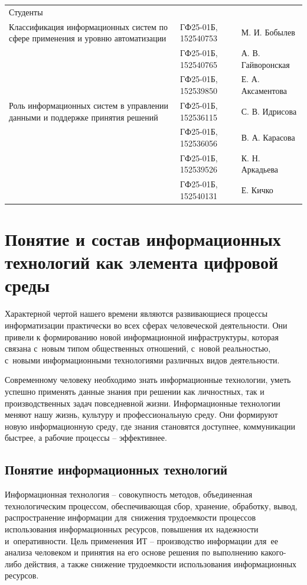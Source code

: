 \documentclass{ou}
\begin{document}
\begin{flushleft}
\doublespacing
\begin{tabularx}{\textwidth}{@{} p{} l l @{}}
Студенты     &                     &         \\
\multirow{-2.27}{\hsize}{\singlespacing Классификация информационных систем по сфере применения и уровню автоматизации}
             & ГФ25-01Б, 152540753 & М. И. Бобылев\\
             & ГФ25-01Б, 152540765 & А. В. Гайворонская\\
             & ГФ25-01Б, 152539850 & Е. А. Аксаментова\\
\multirow{-2.27}{\hsize}{\singlespacing Роль информационных систем в управлении данными и поддержке принятия решений}
             & ГФ25-01Б, 152536115 & С. В. Идрисова\\
             & ГФ25-01Б, 152536056 & В. А. Карасова\\
             & ГФ25-01Б, 152539526 & К. Н. Аркадьева\\
             & ГФ25-01Б, 152540131 & Е. Кичко\\
\end{tabularx}
\end{flushleft}
\newpage
\tableofcontents
\newpage
\onehalfspacing
\newpage
\section{Понятие и состав информационных технологий как элемента цифровой среды}
Характерной чертой нашего времени являются развивающиеся процессы информатизации практически во всех сферах человеческой деятельности. Они привели к формированию новой информационной инфраструктуры, которая связана с~новым типом общественных отношений, с~новой реальностью, с~новыми информационными технологиями различных видов деятельности\cite{Computerra}. 

Современному человеку необходимо знать информационные технологии, уметь успешно применять данные знания при решении как личностных, так и производственных задач повседневной жизни. Информационные технологии меняют нашу жизнь, культуру и профессиональную среду. Они формируют новую информационную среду, где знания становятся доступнее, коммуникации быстрее, а рабочие процессы -- эффективнее\cite{skyeng}.
\subsection{Понятие информационных технологий}
Информационная технология -- совокупность методов, объединенная технологическим процессом, обеспечивающая сбор, хранение, обработку, вывод, 
распространение информации для~снижения трудоемкости процессов использования информационных ресурсов, повышения их надежности и~оперативности. Цель применения ИТ -- производство информации для~ее анализа человеком и принятия на его основе решения по выполнению какого-либо действия, а также снижение трудоемкости использования информационных ресурсов\cite{Portal.tpu}.
\end{document}
